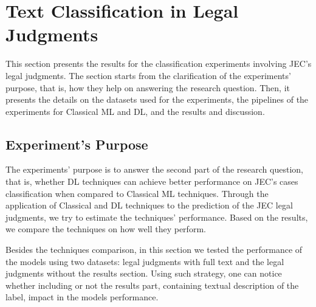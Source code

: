 \section{Text Classification in Legal Judgments}\label{sec:text_classification}




This section presents the results for the classification experiments involving \gls{JEC}'s legal judgments. The section starts from the clarification of the experiments' purpose, that is, how they help on answering the research question. Then, it presents the details on the datasets used for the experiments, the pipelines of the experiments for Classical \gls{ML} and \gls{DL}, and the results and discussion.

\subsection{Experiment's Purpose}



The experiments' purpose is to answer the second part of the research question, that is, whether \gls{DL} techniques  can achieve better performance on \gls{JEC}'s cases classification when compared to Classical \gls{ML} techniques.
Through the application of Classical and \gls{DL} techniques to the prediction of the \gls{JEC} legal judgments, we try to estimate the techniques' performance. 
Based on the results, we compare the techniques on how well they perform.

Besides the techniques comparison, in this section we tested the performance of the models using two datasets: legal judgments with full text and the legal judgments without the results section. Using  such strategy, one can notice whether including or not the results part, containing textual description of the label, impact in the models performance. 


